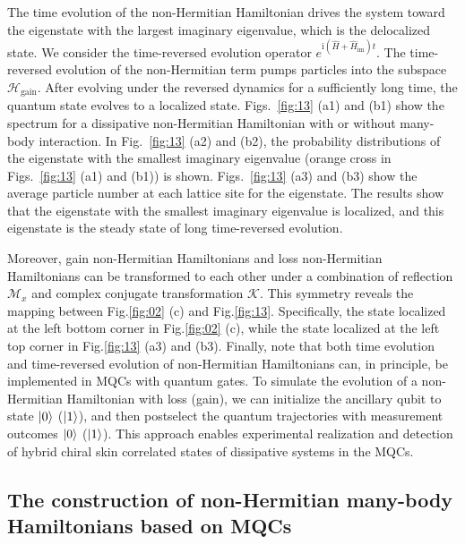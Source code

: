 \documentclass[longbibliography, aps, prx, amsmath, amssymb, amsfonts, twocolumn,superscriptaddress, footinbib]{revtex4-1}
\begin{document}
	The time evolution of the  non-Hermitian Hamiltonian drives the system toward the eigenstate with the largest imaginary eigenvalue, which is the delocalized state.
	We consider the time-reversed evolution operator $e^{\mathrm{i}(\hat{H} + \hat{H}_{\text{im}})t}$. The time-reversed evolution of the non-Hermitian term pumps particles into the subspace $\mathscr{H}_{\text{gain}}$. After evolving under the reversed dynamics for a sufficiently long time, the quantum state evolves to a localized state.
	Figs.~\ref{fig:13} (a1) and (b1) show the spectrum for a dissipative non-Hermitian Hamiltonian with or without many-body interaction. 
	In Fig.~\ref{fig:13} (a2) and (b2), the probability distributions of the eigenstate with the smallest imaginary eigenvalue (orange cross in Figs.~\ref{fig:13} (a1) and (b1)) is shown.
	Figs.~\ref{fig:13} (a3) and (b3) show the average particle number at each lattice site for the eigenstate. 
	The results show that the eigenstate with the smallest imaginary eigenvalue is localized, and this eigenstate is the steady state of long time-reversed evolution. 

	Moreover, gain non-Hermitian Hamiltonians and loss non-Hermitian Hamiltonians can be transformed to each other under a combination of reflection $\mathcal{M}_x$ and complex conjugate transformation $\mathcal{K}$.
	This symmetry reveals the mapping between Fig.\ref{fig:02} (c) and Fig.\ref{fig:13}. Specifically, the state localized at the left bottom corner in Fig.\ref{fig:02} (c), while the state localized at the left top corner in Fig.\ref{fig:13} (a3) and (b3).
	Finally, note that both time evolution and time-reversed evolution of non-Hermitian Hamiltonians can, in principle, be implemented in MQCs with quantum gates. To simulate the evolution of a non-Hermitian Hamiltonian with loss (gain), we can initialize the ancillary qubit to state $\ket{0}$ ($\ket{1}$), and then postselect the quantum trajectories with measurement outcomes $\ket{0}$ ($\ket{1}$). This approach enables experimental realization and detection of hybrid chiral skin correlated states of dissipative systems in the MQCs.


	\subsection{The construction of non-Hermitian many-body Hamiltonians based on MQCs~\label{sec:scheme_method}}
\end{document}
